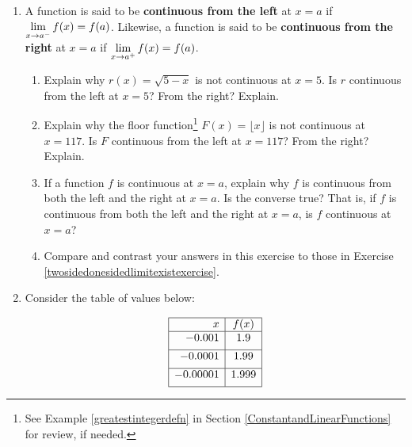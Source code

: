 \begin{enumerate}
\item\label{onesidedcontinuityexercise}  A function is said to be \textbf{continuous from the left} at $x=a$ if $\displaystyle{\lim_{x \rightarrow a^{-}} f(x) = f(a)}$.  Likewise, a function is said to be \textbf{continuous from the right} at $x=a$ if $\displaystyle{\lim_{x \rightarrow a^{+}} f(x) = f(a)}$.

\begin{enumerate}

\item   Explain why $r(x) = \sqrt{5-x}$ is not continuous at $x = 5$.  Is $r$ continuous from the left at $x=5$?  From the right?  Explain.

\item  Explain why the floor function\footnote{See Example \ref{greatestintegerdefn} in Section \ref{ConstantandLinearFunctions} for review, if needed.} $F(x) = \lfloor x \rfloor$ is not continuous at $x = 117$.   Is $F$ continuous from the left at $x=117$?  From the right?  Explain.

\item  If a function $f$ is continuous at $x = a$, explain why $f$ is continuous from both the left and the right at $x = a$.  Is the converse true?  That is, if $f$ is continuous from both the left and the right at $x = a$, is $f$ continuous at $x=a$?  

\item  Compare and contrast your answers in this exercise to those in Exercise \ref{twosidedonesidedlimitexistexercise}.


\end{enumerate}


\item  Consider the table of values below:

\[ \begin{array}{|r|c|} 

\hline

x & f(x)  \\    \hline 

-0.001  &  1.9 \\   [1ex]  \hline 

-0.0001 & 1.99 \\ [1ex]  \hline

-0.00001 & 1.999\\  [1ex] \hline


\end{array}\]
\end{enumerate}
